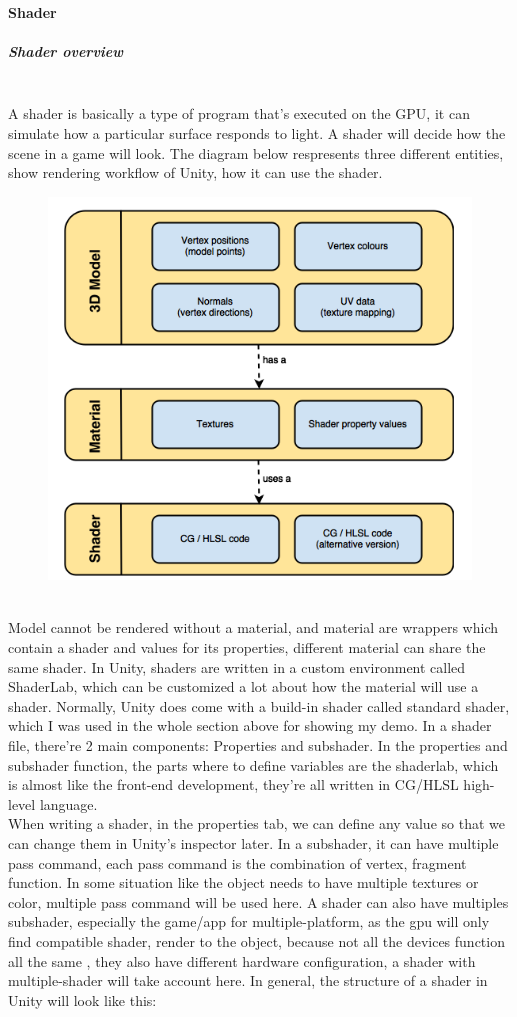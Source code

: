 \documentclass[a4paper, 13pt]{extarticle}
\begin{document}
{ \paragraph{Shader} \vspace{-0.2cm}
 \subparagraph{Shader overview} ~\\[0.1cm]
 A shader is basically a type of program that's executed on the GPU, it can simulate how a particular surface responds to light. A shader will decide how the scene in a game will look. The diagram below respresents three different entities, show rendering workflow of Unity, how it can use the shader. 
 \begin{figure}[h]
 		\begin{minipage}{1\textwidth}
 			\centering
 			\includegraphics[width=0.45\linewidth]{intructions/Shader_workflow.png}
 			\centering
 		\end{minipage}
 \end{figure}
\\[0.01cm]
   Model cannot be rendered without a material, and material are wrappers which contain a shader and values for its properties, different material can share the same shader. In Unity, shaders are written in a custom environment called ShaderLab, which can be customized a lot about how the material will use a shader. Normally, Unity does come with a build-in shader called standard shader, which I was used in the whole section above for showing my demo. In a shader file, there're 2 main components: Properties and subshader. In the properties and subshader function, the parts where to define variables are the shaderlab, which is almost like the front-end development, they're all written in CG/HLSL high-level language. \\
   When writing a shader, in the properties tab, we can define any value  so that we can change them in Unity's inspector later. In a subshader, it can have multiple pass command, each pass command is the combination of vertex, fragment function. In some situation like the object needs to have multiple textures or color, multiple pass command will be used here. A shader can also have multiples subshader, especially the game/app for multiple-platform, as the gpu will only find compatible shader, render to the object, because not all the devices function all the same , they also have different hardware configuration, a shader with multiple-shader will take account here. In general, the structure of a shader in Unity will look like this: 
}
\end{document}
